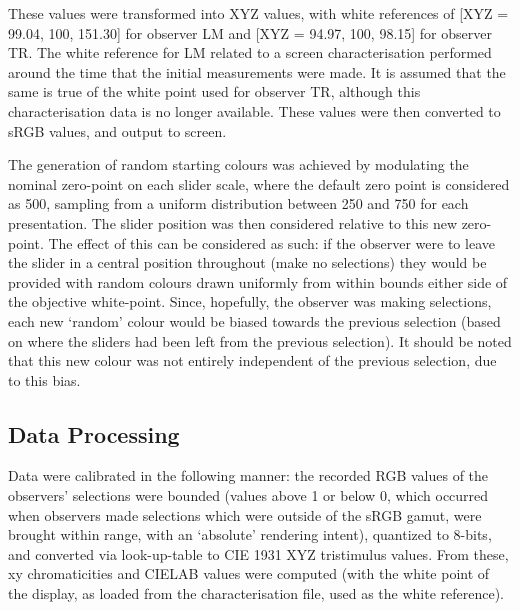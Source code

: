 These values were transformed into XYZ values, with white references of [XYZ = 99.04, 100, 151.30] for observer LM and [XYZ = 94.97, 100, 98.15] for observer TR. The white reference for LM related to a screen characterisation performed around the time that the initial measurements were made. It is assumed that the same is true of the white point used for observer TR, although this characterisation data is no longer available. These values were then converted to sRGB values, and output to screen.

The generation of random starting colours was achieved by modulating the nominal zero-point on each slider scale, where the default zero point is considered as 500, sampling from a uniform distribution between 250 and 750 for each presentation. The slider position was then considered relative to this new zero-point. The effect of this can be considered as such: if the observer were to leave the slider in a central position throughout (make no selections) they would be provided with random colours drawn uniformly from within bounds either side of the objective white-point. Since, hopefully, the observer was making selections, each new `random' colour would be biased towards the previous selection (based on where the sliders had been left from the previous selection). It should be noted that this new colour was not entirely independent of the previous selection, due to this bias.



\subsection{Data Processing}

Data were calibrated in the following manner: the recorded RGB values of the observers' selections were bounded (values above 1 or below 0, which occurred when observers made selections which were outside of the sRGB gamut, were brought within range, with an `absolute' rendering intent), quantized to 8-bits, and converted via look-up-table to \gls{CIE} 1931 XYZ tristimulus values. From these, xy chromaticities and CIELAB values were computed (with the white point of the display, as loaded from the characterisation file, used as the white reference).

